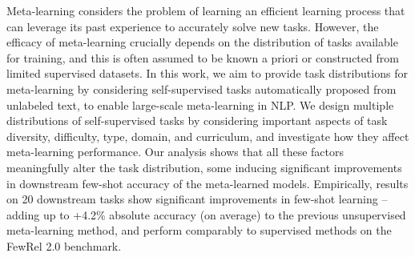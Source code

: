 Meta-learning considers the problem of learning an efficient learning process that can leverage its past experience to accurately solve new tasks. However, the efficacy of meta-learning crucially depends on the distribution of tasks available for training, and this is often assumed to be known a priori or constructed from limited supervised datasets. In this work, we aim to provide task distributions for meta-learning by considering self-supervised tasks automatically proposed from unlabeled text, to enable large-scale meta-learning in NLP. We design multiple distributions of self-supervised tasks by considering important aspects of task diversity, difficulty, type, domain, and curriculum, and investigate how they affect meta-learning performance. Our analysis shows that all these factors meaningfully alter the task distribution, some inducing significant improvements in downstream few-shot accuracy of the meta-learned models. Empirically, results on 20 downstream tasks show significant improvements in few-shot learning -- adding up to +4.2\% absolute accuracy (on average) to the previous unsupervised meta-learning method, and perform comparably to supervised methods on the FewRel 2.0 benchmark.
